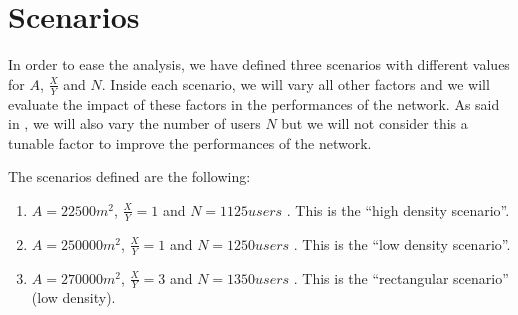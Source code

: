 \section{Scenarios}\label{sec:scenarios}

In order to ease the analysis, we have defined three scenarios with different
values for \(A\), \(\frac{X}{Y}\) and \(N\). Inside each scenario, we will vary
all other factors and we will evaluate the impact of these factors in the
performances of the network. As said in , we will also vary
the number of users \(N\) but we will not consider this a tunable factor to
improve the performances of the network.

The scenarios defined are the following:
\begin{enumerate}
	\item \(A = 22500m^2\), \(\frac{X}{Y} = 1\)  and \(N = 1125\mathit{users}\) . This is the ``high density
		scenario''.
	\item \(A = 250000m^2\), \(\frac{X}{Y} = 1\)  and \(N = 1250\mathit{users}\) . This is the ``low density
		scenario''.
	\item \(A = 270000m^2\), \(\frac{X}{Y} = 3\)  and \(N = 1350\mathit{users}\) . This is the
		``rectangular scenario'' (low density).
\end{enumerate}



